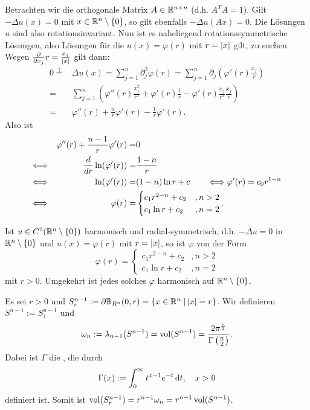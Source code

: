 Betrachten wir die orthogonale Matrix $A\in\mathbb{R}^{n\times n}$ (d.h. $A^TA=1$). Gilt $-\Delta u(x)=0$ mit $x\in\mathbb{R}^n\setminus\{0\}$, so gilt ebenfalls $-\Delta u(Ax)=0$. Die Lösungen $u$ sind also rotationsinvariant. Nun ist es naheliegend rotationssymmetrische Lösungen, also Lösungen für die $u(x)=\varphi(r)$ mit $r=\lvert x\rvert$ gilt, zu suchen. Wegen $\frac{\partial}{\partial x_j}r=\frac{x_j}{\lvert x\rvert}$ gilt dann:
\[  
  \begin{split}
    0\overset!=&\Delta u(x)=\sum_{j=1}^n\partial_j^2\varphi(r)
  =\sum_{j=1}^n\partial_j\left(\varphi'(r)\frac{x_j}r\right) \\
  =&\sum_{j=1}^n\left(
    \varphi''(r)\frac{x_j^2}{r^2}+\varphi'(r)\frac 1r-\varphi'(r)\frac{x_j}{r^2}\frac{x_j}r
  \right) \\
  =&\varphi''(r)+\frac nr\varphi'(r)-\frac 1r\varphi'(r).
  \end{split}
\]
Also ist
\begin{align*}
  &&\varphi''(r)+\frac{n-1}r\varphi'(r)=&0 \\
  \Longleftrightarrow&& \frac{d}{d r}\ln(\varphi'(r)) =& \frac{1-n}r \\
  \Longleftrightarrow&& \ln(\varphi'(r))=&(1-n)\ln r+c\qquad \Longleftrightarrow \varphi'(r)=c_0r^{1-n} \\
  \Longleftrightarrow&& \varphi(r)=&
  \begin{cases}
    c_1r^{2-n}+c_2 &,n>2 \\
    c_1\ln r+c_2 &, n=2
  \end{cases}.
\end{align*}

\begin{lemma}
  \label{lemma:4.3}
  Ist $u\in C^2(\mathbb{R}^n\setminus\{0\})$ harmonisch und radial-symmetrisch, d.h. $-\Delta u=0$ in $\mathbb{R}^n\setminus\{0\}$ und $u(x)=\varphi(r)$ mit $r=\lvert x\rvert$, so ist $\varphi$ von der Form
  \[
  \varphi(r)=\begin{cases}
    c_1 r^{2-n}+c_2 &,n>2 \\
    c_1\ln r+c_2 &, n=2
  \end{cases}
  \]
mit $r>0$. Umgekehrt ist jedes solches $\varphi$ harmonisch auf $\mathbb{R}^n\setminus\{0\}$.
\end{lemma}

\begin{defi}
  Es sei $r>0$ und $S_r^{n-1}:=\partial\mathbb{B}_{R^n}(0,r)=\{x\in\mathbb{R}^n\;\vert\, \lvert x\rvert=r\}$. Wir definieren $S^{n-1}:=S_1^{n-1}$ und
  \[
  \omega_n:=\lambda_{n-1}(S^{n-1})=\operatorname{vol}(S^{n-1})=\frac{2\pi^{\frac n2}}{\Gamma\left(\frac n2\right)}.
  \]
  Dabei ist $\Gamma$ die , die durch
  \[
  \Gamma(x):=\int_0^\infty t^{x-1}e^{-t}\,\mathrm{d} t,\quad x>0
  \]
  definiert ist. Somit ist $\operatorname{vol}(S_r^{n-1})=r^{n-1}\omega_n=r^{n-1}\operatorname{vol}(S^{n-1})$.
\end{defi}

